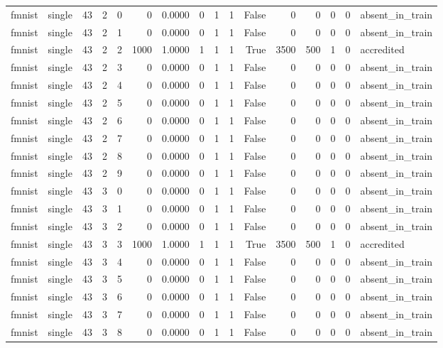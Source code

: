 \begin{tabular}{llrrrrrrrrrrrrrl}
fmnist & single & 43 & 2 & 0 & 0 & 0.0000 & 0 & 1 & 1 & False & 0 & 0 & 0 & 0 & absent\_in\_train \\
fmnist & single & 43 & 2 & 1 & 0 & 0.0000 & 0 & 1 & 1 & False & 0 & 0 & 0 & 0 & absent\_in\_train \\
fmnist & single & 43 & 2 & 2 & 1000 & 1.0000 & 1 & 1 & 1 & True & 3500 & 500 & 1 & 0 & accredited \\
fmnist & single & 43 & 2 & 3 & 0 & 0.0000 & 0 & 1 & 1 & False & 0 & 0 & 0 & 0 & absent\_in\_train \\
fmnist & single & 43 & 2 & 4 & 0 & 0.0000 & 0 & 1 & 1 & False & 0 & 0 & 0 & 0 & absent\_in\_train \\
fmnist & single & 43 & 2 & 5 & 0 & 0.0000 & 0 & 1 & 1 & False & 0 & 0 & 0 & 0 & absent\_in\_train \\
fmnist & single & 43 & 2 & 6 & 0 & 0.0000 & 0 & 1 & 1 & False & 0 & 0 & 0 & 0 & absent\_in\_train \\
fmnist & single & 43 & 2 & 7 & 0 & 0.0000 & 0 & 1 & 1 & False & 0 & 0 & 0 & 0 & absent\_in\_train \\
fmnist & single & 43 & 2 & 8 & 0 & 0.0000 & 0 & 1 & 1 & False & 0 & 0 & 0 & 0 & absent\_in\_train \\
fmnist & single & 43 & 2 & 9 & 0 & 0.0000 & 0 & 1 & 1 & False & 0 & 0 & 0 & 0 & absent\_in\_train \\
fmnist & single & 43 & 3 & 0 & 0 & 0.0000 & 0 & 1 & 1 & False & 0 & 0 & 0 & 0 & absent\_in\_train \\
fmnist & single & 43 & 3 & 1 & 0 & 0.0000 & 0 & 1 & 1 & False & 0 & 0 & 0 & 0 & absent\_in\_train \\
fmnist & single & 43 & 3 & 2 & 0 & 0.0000 & 0 & 1 & 1 & False & 0 & 0 & 0 & 0 & absent\_in\_train \\
fmnist & single & 43 & 3 & 3 & 1000 & 1.0000 & 1 & 1 & 1 & True & 3500 & 500 & 1 & 0 & accredited \\
fmnist & single & 43 & 3 & 4 & 0 & 0.0000 & 0 & 1 & 1 & False & 0 & 0 & 0 & 0 & absent\_in\_train \\
fmnist & single & 43 & 3 & 5 & 0 & 0.0000 & 0 & 1 & 1 & False & 0 & 0 & 0 & 0 & absent\_in\_train \\
fmnist & single & 43 & 3 & 6 & 0 & 0.0000 & 0 & 1 & 1 & False & 0 & 0 & 0 & 0 & absent\_in\_train \\
fmnist & single & 43 & 3 & 7 & 0 & 0.0000 & 0 & 1 & 1 & False & 0 & 0 & 0 & 0 & absent\_in\_train \\
fmnist & single & 43 & 3 & 8 & 0 & 0.0000 & 0 & 1 & 1 & False & 0 & 0 & 0 & 0 & absent\_in\_train \\

\end{tabular}
